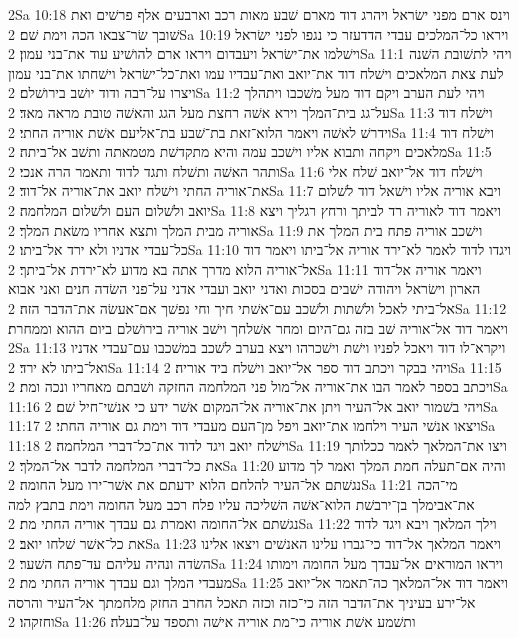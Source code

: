2Sa 10:18  וינס ארם מפני ישׂראל ויהרג דוד מארם שׁבע מאות רכב וארבעים אלף פרשׁים ואת שׁובך שׂר־צבאו הכה וימת שׁם׃
2Sa 10:19  ויראו כל־המלכים עבדי הדדעזר כי נגפו לפני ישׂראל וישׁלמו את־ישׂראל ויעבדום ויראו ארם להושׁיע עוד את־בני עמון׃
2Sa 11:1  ויהי לתשׁובת השׁנה לעת צאת המלאכים וישׁלח דוד את־יואב ואת־עבדיו עמו ואת־כל־ישׂראל וישׁחתו את־בני עמון ויצרו על־רבה ודוד יושׁב בירושׁלם׃
2Sa 11:2  ויהי לעת הערב ויקם דוד מעל משׁכבו ויתהלך על־גג בית־המלך וירא אשׁה רחצת מעל הגג והאשׁה טובת מראה מאד׃
2Sa 11:3  וישׁלח דוד וידרשׁ לאשׁה ויאמר הלוא־זאת בת־שׁבע בת־אליעם אשׁת אוריה החתי׃
2Sa 11:4  וישׁלח דוד מלאכים ויקחה ותבוא אליו וישׁכב עמה והיא מתקדשׁת מטמאתה ותשׁב אל־ביתה׃
2Sa 11:5  ותהר האשׁה ותשׁלח ותגד לדוד ותאמר הרה אנכי׃
2Sa 11:6  וישׁלח דוד אל־יואב שׁלח אלי את־אוריה החתי וישׁלח יואב את־אוריה אל־דוד׃
2Sa 11:7  ויבא אוריה אליו וישׁאל דוד לשׁלום יואב ולשׁלום העם ולשׁלום המלחמה׃
2Sa 11:8  ויאמר דוד לאוריה רד לביתך ורחץ רגליך ויצא אוריה מבית המלך ותצא אחריו משׂאת המלך׃
2Sa 11:9  וישׁכב אוריה פתח בית המלך את כל־עבדי אדניו ולא ירד אל־ביתו׃
2Sa 11:10  ויגדו לדוד לאמר לא־ירד אוריה אל־ביתו ויאמר דוד אל־אוריה הלוא מדרך אתה בא מדוע לא־ירדת אל־ביתך׃
2Sa 11:11  ויאמר אוריה אל־דוד הארון וישׂראל ויהודה ישׁבים בסכות ואדני יואב ועבדי אדני על־פני השׂדה חנים ואני אבוא אל־ביתי לאכל ולשׁתות ולשׁכב עם־אשׁתי חיך וחי נפשׁך אם־אעשׂה את־הדבר הזה׃
2Sa 11:12  ויאמר דוד אל־אוריה שׁב בזה גם־היום ומחר אשׁלחך וישׁב אוריה בירושׁלם ביום ההוא וממחרת׃
2Sa 11:13  ויקרא־לו דוד ויאכל לפניו וישׁת וישׁכרהו ויצא בערב לשׁכב במשׁכבו עם־עבדי אדניו ואל־ביתו לא ירד׃
2Sa 11:14  ויהי בבקר ויכתב דוד ספר אל־יואב וישׁלח ביד אוריה׃
2Sa 11:15  ויכתב בספר לאמר הבו את־אוריה אל־מול פני המלחמה החזקה ושׁבתם מאחריו ונכה ומת׃
2Sa 11:16  ויהי בשׁמור יואב אל־העיר ויתן את־אוריה אל־המקום אשׁר ידע כי אנשׁי־חיל שׁם׃
2Sa 11:17  ויצאו אנשׁי העיר וילחמו את־יואב ויפל מן־העם מעבדי דוד וימת גם אוריה החתי׃
2Sa 11:18  וישׁלח יואב ויגד לדוד את־כל־דברי המלחמה׃
2Sa 11:19  ויצו את־המלאך לאמר ככלותך את כל־דברי המלחמה לדבר אל־המלך׃
2Sa 11:20  והיה אם־תעלה חמת המלך ואמר לך מדוע נגשׁתם אל־העיר להלחם הלוא ידעתם את אשׁר־ירו מעל החומה׃
2Sa 11:21  מי־הכה את־אבימלך בן־ירבשׁת הלוא־אשׁה השׁליכה עליו פלח רכב מעל החומה וימת בתבץ למה נגשׁתם אל־החומה ואמרת גם עבדך אוריה החתי מת׃
2Sa 11:22  וילך המלאך ויבא ויגד לדוד את כל־אשׁר שׁלחו יואב׃
2Sa 11:23  ויאמר המלאך אל־דוד כי־גברו עלינו האנשׁים ויצאו אלינו השׂדה ונהיה עליהם עד־פתח השׁער׃
2Sa 11:24  ויראו המוראים אל־עבדך מעל החומה וימותו מעבדי המלך וגם עבדך אוריה החתי מת׃
2Sa 11:25  ויאמר דוד אל־המלאך כה־תאמר אל־יואב אל־ירע בעיניך את־הדבר הזה כי־כזה וכזה תאכל החרב החזק מלחמתך אל־העיר והרסה וחזקהו׃
2Sa 11:26  ותשׁמע אשׁת אוריה כי־מת אוריה אישׁה ותספד על־בעלה׃
